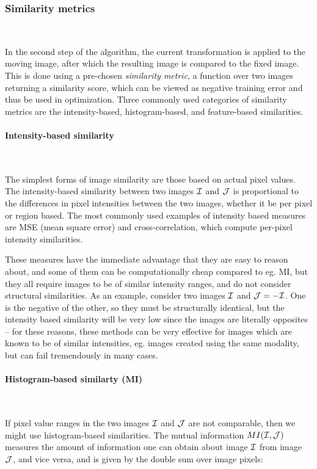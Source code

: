\subsubsection{Similarity metrics}~\smallskip
\label{sec:similarity}

In the second step of the algorithm, the current transformation is applied to
the moving image, after which the resulting image is compared to the fixed
image. This is done using a pre-chosen \textit{similarity metric}, a
function over two images returning a similarity score, which can be viewed as
negative training error and thus be used in optimization. Three commonly used
categories of similarity metrics are the intensity-based, histogram-based, and
feature-based similarities.

\paragraph{Intensity-based similarity}~

The simplest forms of image similarity are those based on actual pixel values.
The intensity-based similarity between two images $\mathcal I$ and $\mathcal J$ is proportional
to the differences in pixel intensities between the two images, whether it be
per pixel or region based. The most commonly used examples of intensity based
measures are  MSE (mean square error) and cross-correlation, which compute
per-pixel intensity similarities.

These measures have the immediate advantage that they are easy to reason about,
and some of them can be computationally cheap compared to eg. MI, but they all
require images to be of similar intensity ranges, and do not consider structural
similarities. As an example, consider two images $\mathcal I$ and $\mathcal J = -\mathcal I$. One is
the negative of the other, so they must be structurally identical, but the
intensity based similarity will be very low since the images are literally
opposites -- for these reasons, these methods can be very effective for images
which are known to be of similar intensities, eg. images created using the same
modality, but can fail tremendously in many cases.

\paragraph{Histogram-based similarty (MI)}~

If pixel value ranges in the two images $\mathcal I$ and $\mathcal J$ are not comparable, then
we might use histogram-based similarities. The mutual information $MI(\mathcal I, \mathcal J)$
measures the amount of information one can obtain about image $\mathcal I$ from image
$\mathcal J$, and vice versa, and is given by the double sum over image pixels:

